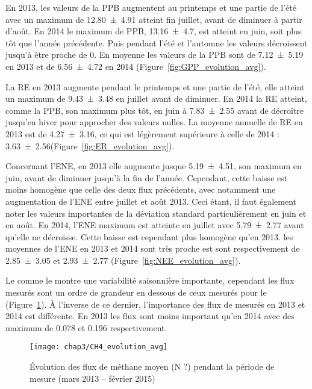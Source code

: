 En 2013, les valeurs de la PPB augmentent au printemps et une partie de l'été avec un maximum de \SI{12.80(491)}{\uml} atteint fin juillet, avant de diminuer à partir d'août.
En 2014 le maximum de PPB, \SI{13.16(470)}{\uml}, est atteint en juin, soit plus tôt que l'année précédente.
Puis pendant l'été et l'automne les valeurs décroissent jusqu'à être proche de 0.
En moyenne les valeurs de la PPB sont de \SI{7.12(519)}{\uml} en 2013 et de \SI{6.56(472)}{\uml} en 2014 (Figure~\ref{fig:GPP_evolution_avg}).

La RE en 2013 augmente pendant le printemps et une partie de l'été, elle atteint un maximum de \SI{9.43(348)}{\uml} en juillet avant de diminuer.
En 2014 la RE atteint, comme la PPB, son maximum plus tôt, en juin à \SI{7.83(255)}{\uml} avant de décroître jusqu'en hiver pour approcher des valeurs nulles.
La moyenne annuelle de RE en 2013 est de \SI{4.27(316)}{\uml}, ce qui est légèrement supérieure à celle de 2014 : \SI{3.63(256)}{\uml}(Figure~\ref{fig:ER_evolution_avg}).

Concernant l'ENE, en 2013 elle augmente jusque \SI{5.19(451)}{\uml}, son maximum en juin, avant de diminuer jusqu'à la fin de l'année.
Cependant, cette baisse est moins homogène que celle des deux flux précédents, avec notamment une augmentation de l'ENE entre juillet et août 2013.
Ceci étant, il faut également noter les valeurs importantes de la déviation standard particulièrement en juin et en août.
En 2014, l'ENE maximum est atteinte en juillet avec \SI{5.79(277)}{\uml} avant qu'elle ne décroisse.
Cette baisse est cependant plus homogène qu'en 2013.
les moyennes de l'ENE en 2013 et 2014 sont très proche est sont respectivement de \SI{2.85(305)}{\uml} et \SI{2.93(277)}{\uml} (Figure~\ref{fig:NEE_evolution_avg}).


Le \chh comme le \coo montre une variabilité saisonnière importante, cependant les flux mesurés sont un ordre de grandeur en dessous de ceux mesurés pour le \coo (Figure~\ref{fig:CH4_evolution_avg}).
À l'inverse de ce dernier, l'importance des flux de \chh mesurés en 2013 et 2014 est différente.
En 2013 les flux sont moins important qu'en 2014 avec des maximum de \num{0.078} et \SI{0.196}{\uml} respectivement.

\begin{figure}
\centering
\texttt{[image: chap3/CH4\_evolution\_avg]}
\caption{Évolution des flux de méthane moyen (N ?) pendant la période de mesure (mars 2013 -- février 2015)}
\label{fig:CH4_evolution_avg}
\end{figure}

